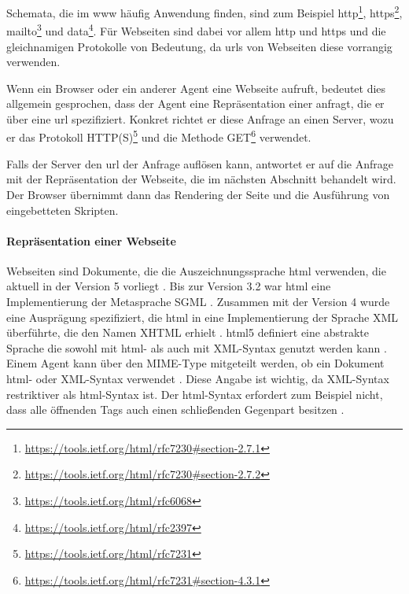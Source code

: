             Schemata, die im \gls{www} häufig Anwendung finden,
            sind zum Beispiel
            http\footnote{\url{https://tools.ietf.org/html/rfc7230\#section-2.7.1}},
            https\footnote{\url{https://tools.ietf.org/html/rfc7230\#section-2.7.2}},
            mailto\footnote{\url{https://tools.ietf.org/html/rfc6068}} und
            data\footnote{\url{https://tools.ietf.org/html/rfc2397}}.
            Für Webseiten sind dabei vor allem http und https
            und die gleichnamigen Protokolle von Bedeutung,
            da \glspl{url} von Webseiten diese vorrangig verwenden.

            Wenn ein Browser oder ein anderer Agent eine Webseite aufruft,
            bedeutet dies allgemein gesprochen, dass der Agent eine Repräsentation
            einer {\resource} anfragt, die er über eine \gls{url} spezifiziert.
            Konkret richtet er diese Anfrage an einen Server,
            wozu er das Protokoll HTTP(S)\footnote{\url{https://tools.ietf.org/html/rfc7231}} und die Methode
            GET\footnote{\url{https://tools.ietf.org/html/rfc7231\#section-4.3.1}} verwendet.

            Falls der Server den \gls{url} der Anfrage auflösen kann,
            antwortet er auf die Anfrage mit der Repräsentation der Webseite,
            die im nächsten Abschnitt behandelt wird.
            Der Browser übernimmt dann das Rendering der Seite und die Ausführung
            von eingebetteten Skripten.

            \paragraph*{Repräsentation einer Webseite}
            Webseiten sind Dokumente, die die Auszeichnungssprache \gls{html} verwenden,
            die aktuell in der Version 5 vorliegt \cite{w3c:html5}.
            Bis zur Version 3.2 war \gls{html} eine Implementierung der Metasprache SGML \cite[Kapitel 3]{w3c:html401}.
            Zusammen mit der Version 4 wurde eine Ausprägung spezifiziert,
            die \gls{html} in eine Implementierung der Sprache XML überführte,
            die den Namen XHTML erhielt \cite{w3c:xhtml}.
            \gls{html}5 definiert eine abstrakte Sprache
            die sowohl mit \gls{html}- als auch mit XML-Syntax genutzt werden kann
            \cite[Kapitel 1.6]{w3c:html5}.
            Einem Agent kann über den MIME-Type mitgeteilt werden,
            ob ein Dokument \gls{html}- oder XML-Syntax verwendet \cite[Kapitel 1.6]{w3c:html5}.
            Diese Angabe ist wichtig, da XML-Syntax restriktiver als \gls{html}-Syntax ist.
            Der \gls{html}-Syntax erfordert zum Beispiel nicht,
            dass alle öffnenden Tags auch einen schließenden Gegenpart besitzen
            \cite[Kapitel 3.2.3]{w3c:html5}.
            
